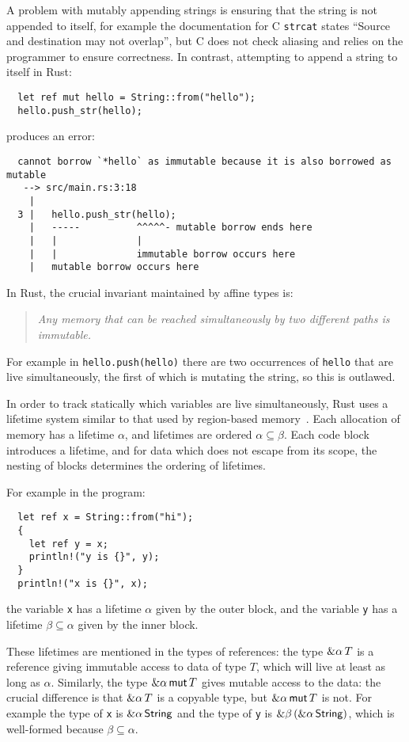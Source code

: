 A problem with mutably appending strings is ensuring that the string
is not appended to itself, for example the documentation for
C \verb|strcat| states ``Source and destination may not
overlap'', but C does not check aliasing and relies on the programmer
to ensure correctness. In contrast, attempting to append a string
to itself in Rust:
\begin{verbatim}
  let ref mut hello = String::from("hello");
  hello.push_str(hello);
\end{verbatim}
produces an error:
\begin{verbatim}
  cannot borrow `*hello` as immutable because it is also borrowed as mutable
   --> src/main.rs:3:18
    |
  3 |   hello.push_str(hello);
    |   -----          ^^^^^- mutable borrow ends here
    |   |              |
    |   |              immutable borrow occurs here
    |   mutable borrow occurs here
\end{verbatim}
In Rust, the crucial invariant maintained by affine types is:
\begin{quote}\em
  Any memory that can be reached simultaneously by two different paths
  is immutable.
\end{quote}
For example in \verb|hello.push(hello)| there are two occurrences of \verb|hello| that
are live simultaneously, the first of which is mutating the string, so this is outlawed.

In order to track statically which variables are live simultaneously, Rust uses a lifetime
system similar to that used by region-based memory~\cite{regions}. Each allocation of
memory has a lifetime $\alpha$, and lifetimes are ordered $\alpha\subseteq\beta$.
Each code block introduces a lifetime, and for data which does not escape from its scope,
the nesting of blocks determines the ordering of lifetimes.

For example in the program:
\begin{verbatim}
  let ref x = String::from("hi");
  {
    let ref y = x;
    println!("y is {}", y);
  }
  println!("x is {}", x);
\end{verbatim}
the variable \verb|x| has a lifetime $\alpha$ given by the outer block,
and the variable \verb|y| has a lifetime $\beta\subseteq\alpha$ given by the inner block.

These lifetimes are mentioned in the types of references: the type $\&\alpha\, T$
is a reference giving immutable access to data of type $T$, which will live at least as long as
$\alpha$. Similarly, the type $\&\alpha\,\mathsf{mut}\, T$ gives mutable access to the data: the crucial
difference is that $\&\alpha\, T$ is a copyable type, but $\&\alpha\,\mathsf{mut}\, T$ is not.
For example
the type of \verb|x| is $\&\alpha\,\mathsf{String}$ and the type of \verb|y| is
$\&\beta\,(\&\alpha\,\mathsf{String})$, which is well-formed because $\beta\subseteq\alpha$.

